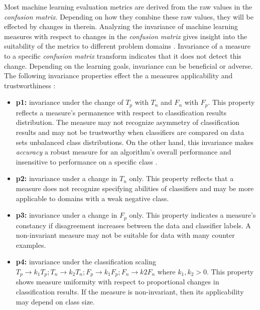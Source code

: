 \documentclass[10pt]{unbthesis}
\begin{document}
Most machine learning evaluation metrics are derived from the raw
values in the \textit{confusion matrix}. Depending on how they combine
these raw values, they will be effected by changes in
therein. Analyzing the invariance of machine learning measures with
respect to changes in the \textit{confusion matrix} gives
insight into the suitability of the metrics to different problem
domains \cite{RefWorks:36}. Invariance of a measure to a specific
\textit{confusion matrix} transform indicates that it does not detect
this change. Depending on the learning goals, invariance can be
beneficial or adverse. The following invariance properties effect the
a measures applicability and trustworthiness \cite{RefWorks:36}:

\begin{itemize}
  \item \textbf{p1:} invariance under the change of \(T_p\) with
    \(T_n\) and \(F_n\) with \(F_p\). This property reflects a
    measure's permanence with respect to classification results
    distribution. The measure may not recognize asymmetry of
    classification results and may not be trustworthy when classifiers
    are compared on data sets unbalanced class distributions. On the
    other hand, this invariance makes \textit{accuracy} a robust
    measure for an algorithm's overall performance and insensitive to
    performance on a specific class \cite{RefWorks:33}.

  \item \textbf{p2:} invariance under a change in \(T_n\) only. This
    property reflects that a measure does not recognize specifying
    abilities of classifiers and may be more applicable to domains
    with a weak negative class.
  
  \item \textbf{p3:} invariance under a change in \(F_p\) only. This
    property indicates a measure's constancy if disagreement increases
    between the data and classifier labels. A non-invariant measure
    may not be suitable for data with many counter examples.

  \item \textbf{p4:} invariance under the classification scaling \(T_p
    \rightarrow k_1 T_p; T_n \rightarrow k_2 T_n; F_p \rightarrow k_1
    F_p; F_n \rightarrow k2 F_n\) where \(k_1,k_2 > 0\). This property
    shows measure uniformity with respect to proportional changes in
    classification results. If the measure is non-invariant, then its
    applicability may depend on class size.

 \end{itemize}
\end{document}
